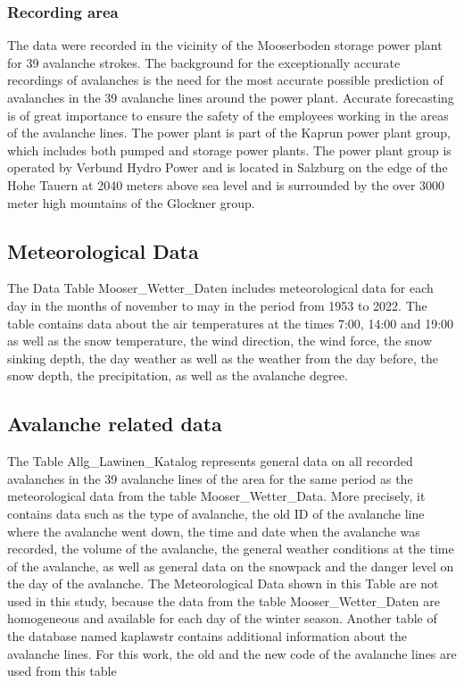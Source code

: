\documentclass[12pt,a4paper]{article}
\begin{document}
\subsubsection{Recording area}
The data were recorded in the vicinity of the Mooserboden storage power plant for 39 avalanche strokes. The background for the exceptionally accurate recordings of avalanches is the need for the most accurate possible prediction of avalanches in the 39 avalanche lines around the power plant. Accurate forecasting is of great importance to ensure the safety of the employees working in the areas of the avalanche lines. The power plant is part of the Kaprun power plant group, which includes both pumped and storage power plants. The power plant group is operated by Verbund Hydro Power and is located in Salzburg on the edge of the Hohe Tauern at 2040 meters above sea level and is surrounded by the over 3000 meter high mountains of the Glockner group.\autocites{VerbundKaprun:2022}
 
 


\subsection{Meteorological Data}
 The Data Table Mooser\_Wetter\_Daten includes meteorological data for each day in the months of november to may in the period from 1953 to 2022. The table contains data about the air temperatures at the times 7:00, 14:00 and 19:00 as well as the snow temperature, the wind direction, the wind force, the snow sinking depth, the day weather as well as the weather from the day before, the snow depth, the precipitation, as well as the avalanche degree.

\subsection{Avalanche related data}
The Table Allg\_Lawinen\_Katalog represents general data on all recorded avalanches in the 39 avalanche lines of the area for the same period as the meteorological data from the table Mooser\_Wetter\_Data. More precisely, it contains data such as the type of avalanche, the old ID of the avalanche line where the avalanche went down, the time and date when the avalanche was recorded, the volume of the avalanche, the general weather conditions at the time of the avalanche, as well as general data on the snowpack and the danger level on the day of the avalanche. The Meteorological Data shown in this Table are not used in this study, because the data from the table Mooser\_Wetter\_Daten are homogeneous and available for each day of the winter season. 
Another table of the database named kaplawstr contains additional information about the avalanche lines. For this work, the old and the new code of the avalanche lines are used from this table
\end{document}

